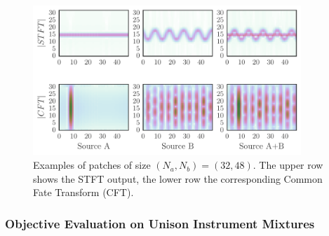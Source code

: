 \begin{figure}[!h]
\centering
		\includegraphics[width=0.9\textwidth]{Chapters/06_Separation_Unknown/figures/gridplot.pdf}
\caption{Examples of patches of size $(N_a, N_b) = (32, 48)$. The upper row shows the STFT output, the lower row the corresponding Common Fate Transform (CFT).}
\label{fig:gridplot}
\end{figure}

\subsubsection{Objective Evaluation on Unison Instrument Mixtures}

